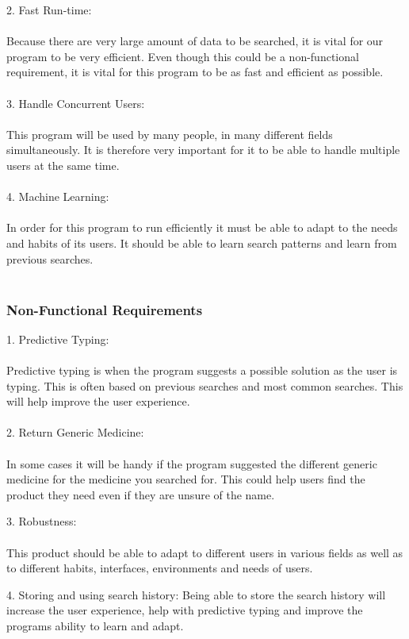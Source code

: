 \documentclass[a4paper,10pt]{article}
\begin{document}
{	2.	Fast Run-time:\\\\
	Because there are very large amount of data to be searched, it is vital for our program to be very efficient.  Even though this could be a non-functional requirement, it is vital for this program to be as fast and efficient as possible.\\\\
	
	3.	Handle Concurrent Users:\\\\
	This program will be used by many people, in many different fields simultaneously. It is therefore very important for it to be able to handle multiple users at the same time.\\\\
	
	4.	Machine Learning:\\\\
	In order for this program to run efficiently it must be able to adapt to the needs and habits of its users. It should be able to learn search patterns and learn from previous searches.\\\\
	\subsubsection{Non-Functional Requirements}
	1.	Predictive Typing:\\\\
	Predictive typing is when the program suggests a possible solution as the user is typing. This is often based on previous searches and most common searches. This will help improve the user experience. \\\\

	2.	Return Generic Medicine:\\\\
	In some cases it will be handy if the program suggested the different generic medicine for the medicine you searched for. This could help users find the product they need even if they are unsure of the name.
	
	3.	Robustness:\\\\
	This product should be able to adapt to different users in various fields as well as to different habits, interfaces, environments and needs of users.  
	
	4.	Storing and using search history: 
	Being able to store the search history will increase the user experience, help with predictive typing and improve the programs ability to learn and adapt.

}
\end{document}
